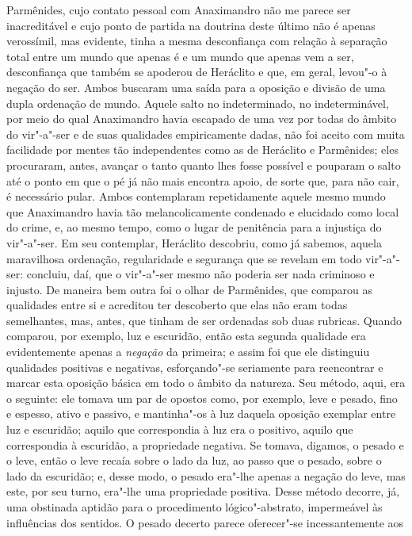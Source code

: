 Parmênides, cujo contato pessoal com Anaximandro não me parece ser
inacreditável e cujo ponto de partida na doutrina deste último não é
apenas verossímil, mas evidente, tinha a mesma desconfiança com
relação à separação total entre um mundo que apenas é e um mundo que
apenas vem a ser, desconfiança que também se apoderou de Heráclito e
que, em geral, levou"-o à negação do ser. Ambos buscaram uma saída para
a oposição e divisão de uma dupla ordenação de mundo. Aquele salto no
indeterminado, no indeterminável, por meio do qual Anaximandro havia
escapado de uma vez por todas do âmbito do vir"-a"-ser e de suas
qualidades empiricamente dadas, não foi aceito com muita facilidade por
mentes tão independentes como as de Heráclito e Parmênides; eles
procuraram, antes, avançar o tanto quanto lhes fosse possível e
pouparam o salto até o ponto em que o pé já não mais encontra apoio, de
sorte que, para não cair, é necessário pular. Ambos contemplaram
repetidamente aquele mesmo mundo que Anaximandro havia tão
melancolicamente condenado e elucidado como local do crime, e, ao mesmo
tempo, como o lugar de penitência para a injustiça do vir"-a"-ser. Em seu
contemplar, Heráclito descobriu, como já sabemos, aquela maravilhosa
ordenação, regularidade e segurança que se revelam em todo vir"-a"-ser:
concluiu, daí, que o vir"-a"-ser mesmo não poderia ser nada criminoso e
injusto. De maneira bem outra foi o olhar de Parmênides, que comparou as
qualidades entre si e acreditou ter descoberto que elas não eram
todas semelhantes, mas, antes, que tinham de ser ordenadas sob duas rubricas.
Quando comparou, por exemplo, luz e escuridão, então esta segunda
qualidade era evidentemente apenas a \textit{negação} da primeira; e
assim foi que ele distinguiu qualidades positivas e negativas,
esforçando"-se seriamente para reencontrar e marcar esta oposição básica
em todo o âmbito da natureza. Seu método, aqui, era o seguinte: ele
tomava um par de opostos como, por exemplo, leve e pesado, fino e \label{eletomavaumpar}
espesso, ativo e passivo, e mantinha"-os à luz daquela oposição exemplar
entre luz e escuridão; aquilo que correspondia à luz era o positivo,
aquilo que correspondia à escuridão, a propriedade negativa. Se tomava,
digamos, o pesado e o leve, então o leve recaía sobre o lado da luz, ao
passo que o pesado, sobre o lado da escuridão; e, desse modo, o pesado
era"-lhe apenas a negação do leve, mas este, por seu turno, era"-lhe uma
propriedade positiva. Desse método decorre, já, uma obstinada aptidão
para o procedimento lógico"-abstrato, impermeável às influências dos
sentidos. O pesado decerto parece oferecer"-se incessantemente aos 
